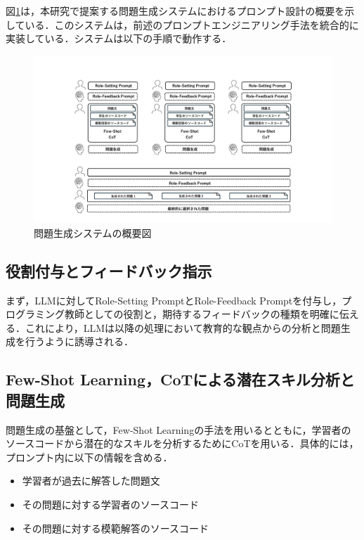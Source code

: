 \documentclass[11pt]{jreport}
\begin{document}
図\ref{fig:system_overview}は，本研究で提案する問題生成システムにおけるプロンプト設計の概要を示している．このシステムは，前述のプロンプトエンジニアリング手法を統合的に実装している．システムは以下の手順で動作する．

\begin{figure}
    \centering
    \includegraphics[width=1.0\linewidth]{figure/archtecture_figure_tlim.pdf}
    \caption{問題生成システムの概要図}
    \label{fig:system_overview}
\end{figure}

\subsection{役割付与とフィードバック指示}

まず，LLMに対してRole-Setting PromptとRole-Feedback Promptを付与し，プログラミング教師としての役割と，期待するフィードバックの種類を明確に伝える．これにより，LLMは以降の処理において教育的な観点からの分析と問題生成を行うように誘導される．

\subsection{Few-Shot Learning，CoTによる潜在スキル分析と問題生成}

問題生成の基盤として，Few-Shot Learningの手法を用いるとともに，学習者のソースコードから潜在的なスキルを分析するためにCoTを用いる．具体的には，プロンプト内に以下の情報を含める．

\begin{itemize}
    \item 学習者が過去に解答した問題文
    \item その問題に対する学習者のソースコード
    \item その問題に対する模範解答のソースコード
\end{itemize}
\end{document}

